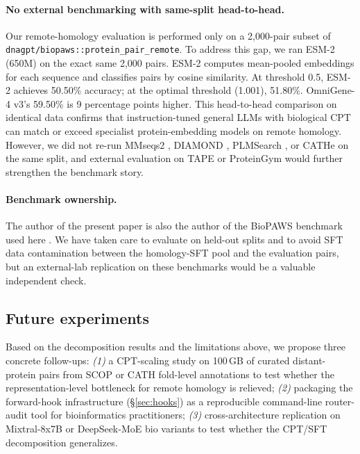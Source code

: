 \documentclass[11pt]{article}
\begin{document}
\paragraph{No external benchmarking with same-split head-to-head.} Our remote-homology evaluation is performed only on a 2{,}000-pair subset of \texttt{dnagpt/biopaws::protein\_pair\_remote}. To address this gap, we ran ESM-2 (650M) \citep{lin2023evolutionary} on the exact same 2{,}000 pairs. ESM-2 computes mean-pooled embeddings for each sequence and classifies pairs by cosine similarity. At threshold 0.5, ESM-2 achieves 50.50\% accuracy; at the optimal threshold (1.001), 51.80\%. OmniGene-4 v3's 59.50\% is 9 percentage points higher. This head-to-head comparison on identical data confirms that instruction-tuned general LLMs with biological CPT can match or exceed specialist protein-embedding models on remote homology. However, we did not re-run MMseqs2 \citep{steinegger2017mmseqs2}, DIAMOND \citep{buchfink2021diamond}, PLMSearch \citep{liu2024plmsearch}, or CATHe \citep{nallapareddy2023cathe} on the same split, and external evaluation on TAPE \citep{rao2019tape} or ProteinGym \citep{notin2023proteingym} would further strengthen the benchmark story.

\paragraph{Benchmark ownership.} The author of the present paper is also the author of the BioPAWS benchmark used here \citep{wang2026biopaws}. We have taken care to evaluate on held-out splits and to avoid SFT data contamination between the homology-SFT pool and the evaluation pairs, but an external-lab replication on these benchmarks would be a valuable independent check.

\subsection*{Future experiments}

Based on the decomposition results and the limitations above, we propose three concrete follow-ups: \emph{(1)} a CPT-scaling study on 100\,GB of curated distant-protein pairs from SCOP \citep{murzin1995scop} or CATH fold-level annotations to test whether the representation-level bottleneck for remote homology is relieved; \emph{(2)} packaging the forward-hook infrastructure (\S\ref{sec:hooks}) as a reproducible command-line router-audit tool for bioinformatics practitioners; \emph{(3)} cross-architecture replication on Mixtral-8x7B \citep{jiang2024mixtral} or DeepSeek-MoE \citep{dai2024deepseekmoe} bio variants to test whether the CPT/SFT decomposition generalizes.
\end{document}
